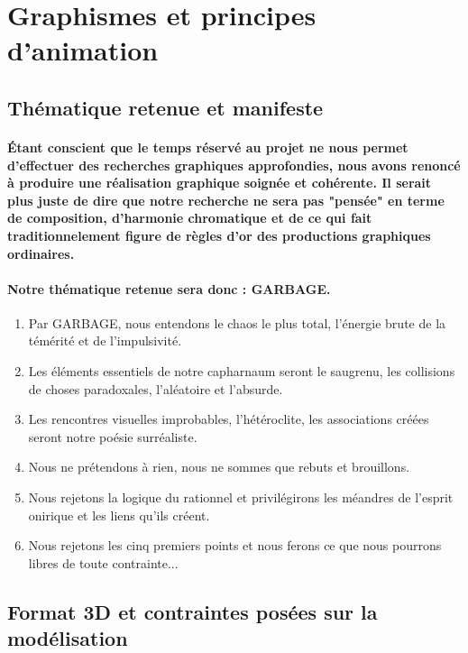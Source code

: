 \section{Graphismes et principes d'animation}
\subsection{Thématique retenue et manifeste}

\paragraph{\'Etant conscient que le temps réservé au projet ne nous permet d'effectuer des recherches graphiques approfondies, nous avons renoncé à produire une réalisation graphique soignée et cohérente. Il serait plus juste de dire que notre recherche ne sera pas "pensée" en terme de composition, d'harmonie chromatique et de ce qui fait traditionnelement figure de règles d'or des productions graphiques ordinaires.}

\paragraph{Notre thématique retenue sera donc : GARBAGE.}

\begin{enumerate}
	\item Par GARBAGE, nous entendons le chaos le plus total, l'énergie brute de la témérité et de l'impulsivité.
	\item Les éléments essentiels de notre capharnaum seront le saugrenu, les collisions de choses paradoxales, l'aléatoire et l'absurde.
	\item Les rencontres visuelles improbables, l'hétéroclite, les associations créées seront notre poésie surréaliste.
	\item Nous ne prétendons à rien, nous ne sommes que rebuts et brouillons.
	\item Nous rejetons la logique du rationnel et privilégirons les méandres de l'esprit onirique et les liens qu'ils créent.
	\item Nous rejetons les cinq premiers points et nous ferons ce que nous pourrons libres de toute contrainte...
\end{enumerate}


\subsection{Format 3D et contraintes posées sur la modélisation}
